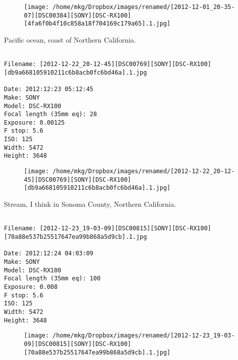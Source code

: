 \begin{figure}
\texttt{[image: /home/mkg/Dropbox/images/renamed/[2012-12-01\_20-35-07][DSC00384][SONY][DSC-RX100][4fa6f0b4f10c858a18f704169c179a65].1.jpg]}
\end{figure}
    
\clearpage
\onecolumn
\noindent Pacific ocean, coast of Northern California.
\noindent
\begin{lstlisting}

Filename: [2012-12-22_20-12-45][DSC00769][SONY][DSC-RX100][db9a668105910211c6b8acb0fc6bd46a].1.jpg

Date: 2012:12:23 05:12:45
Make: SONY
Model: DSC-RX100
Focal length (35mm eq): 28
Exposure: 0.00125
F stop: 5.6
ISO: 125
Width: 5472
Height: 3648
\end{lstlisting}
\clearpage

\begin{figure}
\texttt{[image: /home/mkg/Dropbox/images/renamed/[2012-12-22\_20-12-45][DSC00769][SONY][DSC-RX100][db9a668105910211c6b8acb0fc6bd46a].1.jpg]}
\end{figure}
    
\clearpage
\onecolumn
\noindent Stream, I think in Sonoma County, Northern California.
\noindent
\begin{lstlisting}

Filename: [2012-12-23_19-03-09][DSC00815][SONY][DSC-RX100][70a88e537b25517647ea99b868a5d9cb].1.jpg

Date: 2012:12:24 04:03:09
Make: SONY
Model: DSC-RX100
Focal length (35mm eq): 100
Exposure: 0.008
F stop: 5.6
ISO: 125
Width: 5472
Height: 3648
\end{lstlisting}
\clearpage

\begin{figure}
\texttt{[image: /home/mkg/Dropbox/images/renamed/[2012-12-23\_19-03-09][DSC00815][SONY][DSC-RX100][70a88e537b25517647ea99b868a5d9cb].1.jpg]}
\end{figure}
    
